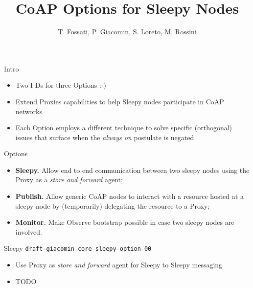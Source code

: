 \documentclass{beamer}
\author{{\scriptsize T. Fossati, P. Giacomin, S. Loreto, M. Rossini}}
\title{CoAP Options for Sleepy Nodes}
\institute{{\large IETF 83, Paris}}
\date{}
\begin{document}
\begin{frame}[plain]
 \titlepage
\end{frame}

\begin{frame}{Intro}

\begin{itemize}
 \item Two I-Ds for three Options :-)
 \item Extend Proxies capabilities to help Sleepy nodes participate in CoAP networks
 \item Each Option employs a different technique to solve specific (orthogonal) issues that surface when the \emph{always on} postulate is negated
\end{itemize}

\end{frame}

\begin{frame}{Options}

\begin{itemize}
 \item \textbf{Sleepy.}  Allow end to end communication between two sleepy nodes using the Proxy as a \emph{store and forward} agent;
 \vspace{.3cm}
 \item \textbf{Publish.}  Allow generic CoAP nodes to interact with a resource hosted at a sleepy node by (temporarily) delegating the resource to a Proxy;
 \vspace{.3cm}
 \item \textbf{Monitor.}  Make Observe bootstrap possible in case two sleepy nodes are involved.
\end{itemize}

\end{frame}


\begin{frame}{Sleepy  \hspace{6cm} {\tiny \texttt{draft-giacomin-core-sleepy-option-00}}}

\begin{itemize}
 \item Use Proxy as \emph{store and forward} agent for Sleepy to Sleepy messaging
 \item TODO
\end{itemize}

\end{frame}
\end{document}
